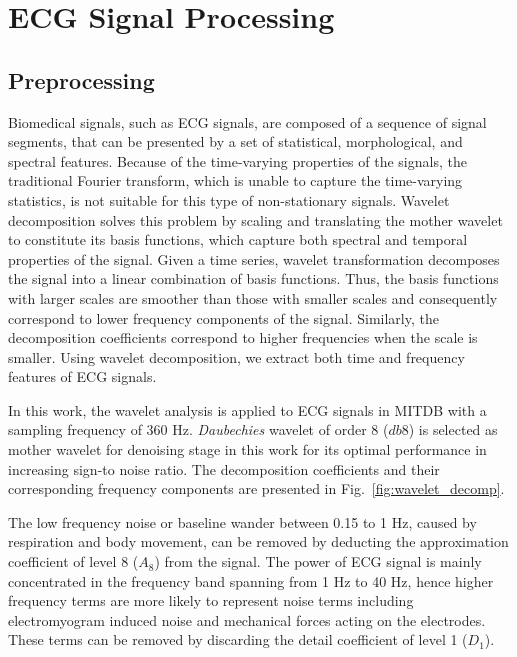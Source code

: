\section{ECG Signal Processing}\label{sec:ecgprocessing}

\subsection{Preprocessing}
Biomedical signals, such as ECG signals, are composed of a sequence of signal segments, that can be presented by a set of statistical, morphological, and spectral features. Because of the time-varying properties of the signals, the traditional Fourier transform, which is unable to capture the time-varying statistics, is not suitable for this type of non-stationary signals. Wavelet decomposition solves this problem by scaling and translating the mother wavelet to constitute its basis functions, which capture both spectral and temporal properties of the signal. Given a time series, wavelet transformation decomposes the signal into a linear combination of basis functions. Thus, the basis functions with larger scales are smoother than those with smaller scales and consequently correspond to lower frequency components of the signal. Similarly, the decomposition coefficients correspond to higher frequencies when the scale is smaller. Using wavelet decomposition, we extract both time and frequency features of ECG signals.


In this work, the wavelet analysis is applied to ECG signals in MITDB with a sampling frequency of 360 Hz. \textit{Daubechies} wavelet of order 8 ($db8$) is selected as mother wavelet for denoising stage in this work for its optimal performance in increasing sign-to noise ratio\cite{denoise}. The decomposition coefficients and their corresponding frequency components are presented in Fig.~\ref{fig:wavelet_decomp}. %

The low frequency noise or baseline wander between 0.15 to 1 Hz, caused by respiration and body movement, can be removed by deducting the approximation coefficient of level 8 ($A_8$) from the signal. The power of ECG signal is mainly concentrated in the frequency band spanning from 1 Hz to 40 Hz, hence higher frequency terms are more likely to represent noise terms including electromyogram induced noise and mechanical forces acting on the electrodes. These terms can be removed by discarding the detail coefficient of level 1 ($D_1$). 

